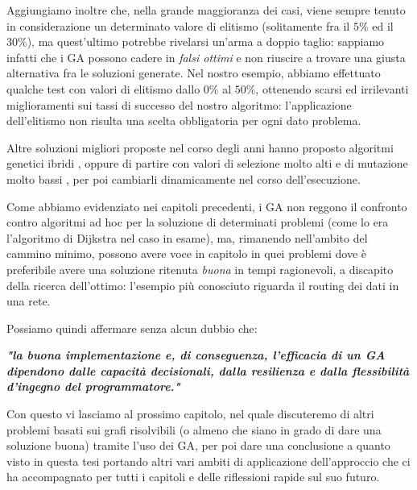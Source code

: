 Aggiungiamo inoltre che, nella grande maggioranza dei casi, viene sempre tenuto in considerazione un determinato valore di elitismo (solitamente fra il $5\%$ ed il $30\%$), ma quest'ultimo potrebbe rivelarsi un'arma a doppio taglio: sappiamo infatti che i GA possono cadere in \textit{falsi ottimi} e non riuscire a trovare una giusta alternativa fra le soluzioni generate.
Nel nostro esempio, abbiamo effettuato qualche test con valori di elitismo dallo $0\%$ al $50\%$, ottenendo scarsi ed irrilevanti miglioramenti sui tassi di successo del nostro algoritmo: l'applicazione dell'elitismo non risulta una scelta obbligatoria per ogni dato problema.
\vspace{3mm}

Altre soluzioni migliori proposte nel corso degli anni hanno proposto algoritmi genetici ibridi \cite{path1}, oppure di partire con valori di selezione molto alti e di mutazione molto bassi \cite{path5}, per poi cambiarli dinamicamente nel corso dell'esecuzione.

Come abbiamo evidenziato nei capitoli precedenti, i GA non reggono il confronto contro algoritmi ad hoc per la soluzione di determinati problemi (come lo era l'algoritmo di Dijkstra nel caso in esame), ma, rimanendo nell'ambito del cammino minimo, possono avere voce in capitolo in quei problemi dove \`e preferibile avere una soluzione ritenuta \textit{buona} in tempi ragionevoli, a discapito della ricerca dell'ottimo: l'esempio pi\`u conosciuto riguarda il routing dei dati in una rete.

Possiamo quindi affermare senza alcun dubbio che:
\vspace{3mm}

\begin{large}\textit{\textbf{"la buona implementazione e, di conseguenza, l'efficacia di un GA dipendono dalle capacit\`a decisionali, dalla resilienza e dalla flessibilit\`a d'ingegno del programmatore."}}
\end{large}
\vspace{3mm}

Con questo vi lasciamo al prossimo capitolo, nel quale discuteremo di altri problemi basati sui grafi risolvibili (o almeno che siano in grado di dare una soluzione buona) tramite l'uso dei GA, per poi dare una conclusione a quanto visto in questa tesi portando altri vari ambiti di applicazione dell'approccio che ci ha accompagnato per tutti i capitoli e delle riflessioni rapide sul suo futuro.
\newpage
